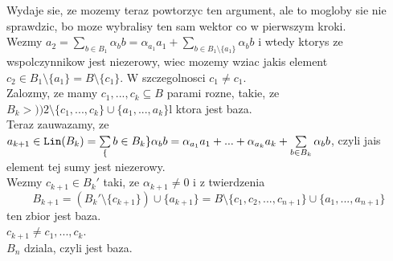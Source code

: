 \documentclass{article}
\begin{document}
Wydaje sie, ze mozemy teraz powtorzyc ten argument, ale to mogloby sie nie sprawdzic, bo moze wybralisy ten sam wektor co w pierwszym kroki.\\
Wezmy $a_2=\sum\limits_{b\in B_1}\alpha_bb=\alpha_{a_1}a_1+\sum\limits_{b\in B_1\setminus\{a_1\}}\alpha_bb$ i wtedy ktorys ze wspolczynnikow jest niezerowy, wiec mozemy wziac jakis element $c_2\in B_1\setminus\{a_1\}=B\setminus\{c_1\}$. W szczegolnosci $c_1\neq c_1$.\\
Zalozmy, ze mamy $c_1, ..., c_k\subseteq B$ parami rozne, takie, ze $B_k>))2\setminus\{c_1, ..., c_k\}\cup\{a_1, ..., a_k\}$l ktora jest baza.\\
Teraz zauwazamy, ze $a_{k+1}\in\texttt{Lin}(B_k)=\sum\limits_\{b\in B_k\}\alpha_bb=\alpha_{a_1}a_1+...+\alpha_{a_k}a_k+\sum\limits_{b\in B_k}\alpha_bb$, czyli jais element tej sumy jest niezerowy.\\
Wezmy $c_{k+1}\in B_k'$ taki, ze $\alpha_{k+1}\neq0$ i z twierdzenia
$$B_{k+1}=(B_k'\setminus \{c_{k+1}\})\cup\{a_{k+1}\}=B\setminus\{c_1, c_2, ..., c_{n+1}\}\cup\{a_1, ..., a_{n+1}\}$$
ten zbior jest baza.\\
$c_{k+1}\neq c_1, ..., c_k$.\\
$B_n$ dziala, czyli jest baza.
\end{document}

